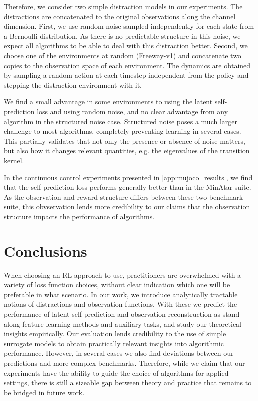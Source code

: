 Therefore, we consider two simple distraction models in our experiments. 
The distractions are concatenated to the original observations along the channel dimension.
First, we use random noise sampled independently for each state from a Bernoulli distribution.
As there is no predictable structure in this noise, we expect all algorithms to be able to deal with this distraction better.
Second, we choose one of the environments at random (Freeway-v1) and concatenate two copies to the observation space of each environment.
The dynamics are obtained by sampling a random action at each timestep independent from the policy and stepping the distraction environment with it.

We find a small advantage in some environments to using the latent self-prediction loss and using random noise, and no clear advantage from any algorithm in the structured noise case.
Structured noise poses a much larger challenge to most algorithms, completely preventing learning in several cases.
This partially validates that not only the presence or absence of noise matters, but also how it changes relevant quantities, e.g. the eigenvalues of the transition kernel.

In the continuous control experiments presented in \autoref{app:mujoco_results}, we find that the self-prediction loss performs generally better than in the MinAtar suite.
As the observation and reward structure differs between these two benchmark suite, this obvservation lends more credibility to our claims that the observation structure impacts the performance of algorithms.

\section{Conclusions}

When choosing an RL approach to use, practitioners are overwhelmed with a variety of loss function choices, without clear indication which one will be preferable in what scenario.
In our work, we introduce analytically tractable notions of distractions and observation functions.
With these we predict the performance of latent self-prediction and observation reconstruction as stand-along feature learning methods and auxiliary tasks, and study our theoretical insights empirically.
Our evaluation lends credibility to the use of simple surrogate models to obtain practically relevant insights into algorithmic performance.
However, in several cases we also find deviations between our predictions and more complex benchmarks.
Therefore, while we claim that our experiments have the ability to guide the choice of algorithms for applied settings, there is still a sizeable gap between theory and practice that remains to be bridged in future work.

